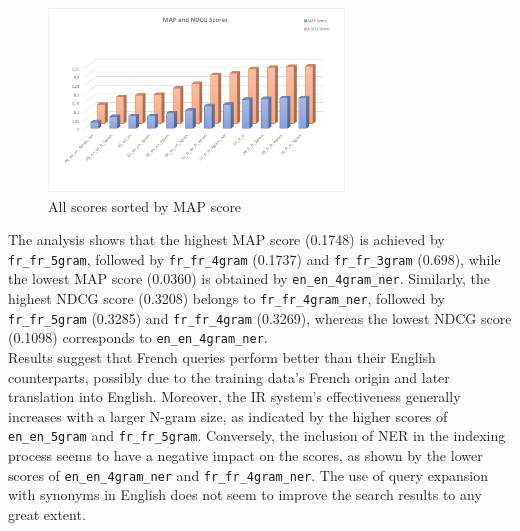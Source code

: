 \begin{figure}[h!]
	\centering
	\includegraphics[width=0.7\textwidth]{figure/allScores.png}
	\caption{All scores sorted by MAP score}
	\label{fig:sorted_scores}
\end{figure}

The analysis shows that the highest MAP score (0.1748) is achieved by \texttt{fr\_fr\_5gram}, followed by \texttt{fr\_fr\_4gram} (0.1737) and \texttt{fr\_fr\_3gram} (0.698), while the lowest MAP score (0.0360) is obtained by \texttt{en\_en\_4gram\_ner}.
Similarly, the highest NDCG score (0.3208) belongs to \texttt{fr\_fr\_4gram\_ner}, followed by \texttt{fr\_fr\_5gram} (0.3285) and \texttt{fr\_fr\_4gram} (0.3269), whereas the lowest NDCG score (0.1098) corresponds to \texttt{en\_en\_4gram\_ner}.\\

Results suggest that French queries perform better than their English counterparts, possibly due to the training data's French origin and later translation into English. Moreover, the IR system's effectiveness generally increases with a larger N-gram size, as indicated by the higher scores
of \texttt{en\_en\_5gram} and \texttt{fr\_fr\_5gram}. Conversely, the inclusion of NER in the indexing process seems to have a negative impact on the scores, as shown by the lower scores of \texttt{en\_en\_4gram\_ner} and \texttt{fr\_fr\_4gram\_ner}.
The use of query expansion with synonyms in English does not seem to improve the search results to any great extent.\\

